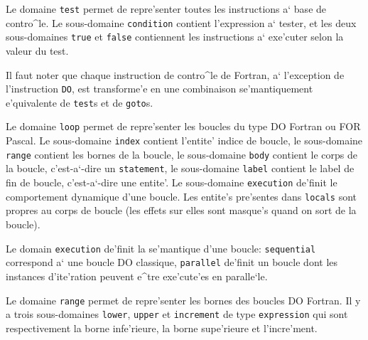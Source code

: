 {
Le domaine \verb/test/ permet de repre'senter toutes les instructions a` base
de contro^le. Le sous-domaine \verb/condition/ contient l'expression a`
tester, et les deux sous-domaines \verb/true/ et \verb/false/ contiennent les
instructions a` exe'cuter selon la valeur du test. 

Il faut noter que chaque instruction de contro^le de Fortran,
a` l'exception de l'instruction \verb/DO/, est
transforme'e en une combinaison se'mantiquement e'quivalente de \verb/test/s
et de \verb/goto/s.
}

{
Le domaine \verb/loop/ permet de repre'senter les boucles du type DO Fortran
ou FOR Pascal. Le sous-domaine \verb/index/ contient l'entite' indice de
boucle, le sous-domaine \verb/range/ contient les bornes de la boucle, le
sous-domaine \verb/body/ contient le corps de la boucle, c'est-a`-dire un
\verb/statement/, le sous-domaine \verb/label/ contient le label de fin de boucle,
c'est-a`-dire une entite'. Le sous-domaine \verb/execution/ de'finit le
comportement dynamique d'une boucle. Les entite's pre'sentes dans
\verb/locals/ sont propres au corps de boucle (les effets sur elles sont
masque's quand on sort de la boucle).
}

{
Le domain \verb/execution/ de'finit la se'mantique d'une boucle:
\verb/sequential/ correspond a` une boucle DO classique, \verb/parallel/
de'finit un boucle dont les instances d'ite'ration peuvent e^tre
exe'cute'es en paralle`le.
}

{
Le domaine \verb/range/ permet de repre'senter les bornes des boucles DO
Fortran. Il y a trois sous-domaines \verb/lower/, \verb/upper/ et \verb/increment/ de
type \verb/expression/ qui sont respectivement la borne infe'rieure, la borne
supe'rieure et l'incre'ment.
}

